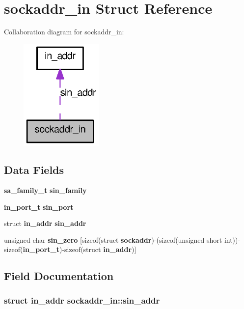 \section{sockaddr\_\-in Struct Reference}
\label{structsockaddr__in}


Collaboration diagram for sockaddr\_\-in:
\nopagebreak
\begin{figure}[H]
\begin{center}
\leavevmode
\includegraphics[width=115pt]{structsockaddr__in__coll__graph}
\end{center}
\end{figure}
\subsection*{Data Fields}
\begin{DoxyCompactItemize}
\item 
{\bf sa\_\-family\_\-t} {\bf sin\_\-family}
\item 
{\bf in\_\-port\_\-t} {\bf sin\_\-port}
\item 
struct {\bf in\_\-addr} {\bf sin\_\-addr}
\item 
unsigned char {\bf sin\_\-zero} [sizeof(struct {\bf sockaddr})-\/(sizeof(unsigned short int))-\/sizeof({\bf in\_\-port\_\-t})-\/sizeof(struct {\bf in\_\-addr})]
\end{DoxyCompactItemize}


\subsection{Field Documentation}
\subsubsection[{sin\_\-addr}]{\setlength{\rightskip}{0pt plus 5cm}struct {\bf in\_\-addr} {\bf sockaddr\_\-in::sin\_\-addr}}\label{structsockaddr__in_a4ea5f2f1138e5c8597097db255a9ec6c}
